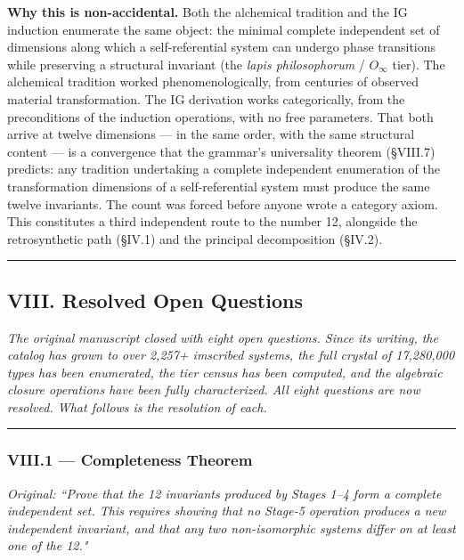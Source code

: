\documentclass[12pt,a4paper]{article}
\newcommand{\Stone}{\textit{lapis philosophorum}}
\begin{document}
\textbf{Why this is non-accidental.} Both the alchemical tradition and the IG induction enumerate the same object: the minimal complete independent set of dimensions along which a self-referential system can undergo phase transitions while preserving a structural invariant (the \Stone{} / $O_{\infty}$ tier). The alchemical tradition worked phenomenologically, from centuries of observed material transformation. The IG derivation works categorically, from the preconditions of the induction operations, with no free parameters. That both arrive at twelve dimensions --- in the same order, with the same structural content --- is a convergence that the grammar's universality theorem (\S VIII.7) predicts: any tradition undertaking a complete independent enumeration of the transformation dimensions of a self-referential system must produce the same twelve invariants. The count was forced before anyone wrote a category axiom. This constitutes a third independent route to the number 12, alongside the retrosynthetic path (\S IV.1) and the principal decomposition (\S IV.2).

\begin{center}
\rule{0.5\textwidth}{0.4pt}
\end{center}

\subsection{VIII. Resolved Open Questions}

\emph{The original manuscript closed with eight open questions. Since its writing, the catalog has grown to over 2,257+ imscribed systems, the full crystal of 17,280,000 types has been enumerated, the tier census has been computed, and the algebraic closure operations have been fully characterized. All eight questions are now resolved. What follows is the resolution of each.}

\begin{center}
\rule{0.5\textwidth}{0.4pt}
\end{center}

\subsubsection{VIII.1 --- Completeness Theorem}

\emph{Original: ``Prove that the 12 invariants produced by Stages 1--4 form a complete independent set. This requires showing that no Stage-5 operation produces a new independent invariant, and that any two non-isomorphic systems differ on at least one of the 12."}
\end{document}
